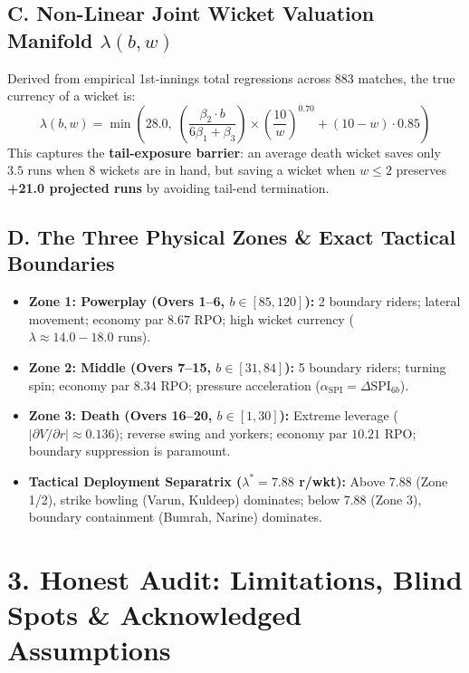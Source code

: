 \documentclass[10pt,a4paper]{article}
\begin{document}
\subsection*{C. Non-Linear Joint Wicket Valuation Manifold $\lambda(b, w)$}
Derived from empirical 1st-innings total regressions across 883 matches, the true currency of a wicket is:
\begin{equation}
    \lambda(b, w) = \min\left(28.0, \; \left( \frac{\beta_2 \cdot b}{6\beta_1 + \beta_3} \right) \times \left( \frac{10}{w} \right)^{0.70} + (10 - w) \cdot 0.85 \right)
\end{equation}
This captures the \textbf{tail-exposure barrier}: an average death wicket saves only $3.5\text{ runs}$ when 8 wickets are in hand, but saving a wicket when $w \le 2$ preserves \textbf{+21.0 projected runs} by avoiding tail-end termination.

\subsection*{D. The Three Physical Zones \& Exact Tactical Boundaries}
\begin{itemize}[leftmargin=1.2em]
    \item \textbf{Zone 1: Powerplay (Overs 1--6, $b \in [85, 120]$):} 2 boundary riders; lateral movement; economy par $8.67$ RPO; high wicket currency ($\lambda \approx 14.0 - 18.0\text{ runs}$).
    \item \textbf{Zone 2: Middle (Overs 7--15, $b \in [31, 84]$):} 5 boundary riders; turning spin; economy par $8.34$ RPO; pressure acceleration ($\alpha_{\text{SPI}} = \Delta \text{SPI}_{6b}$).
    \item \textbf{Zone 3: Death (Overs 16--20, $b \in [1, 30]$):} Extreme leverage ($|\partial V / \partial r| \approx 0.136$); reverse swing and yorkers; economy par $10.21$ RPO; boundary suppression is paramount.
    \item \textbf{Tactical Deployment Separatrix ($\lambda^* = 7.88$ r/wkt):} Above 7.88 (Zone 1/2), strike bowling (Varun, Kuldeep) dominates; below 7.88 (Zone 3), boundary containment (Bumrah, Narine) dominates.
\end{itemize}

\clearpage

\section*{3. Honest Audit: Limitations, Blind Spots \& Acknowledged Assumptions}
\end{document}

